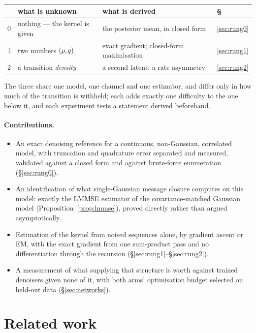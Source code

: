 \documentclass{article}
\begin{document}
\begin{center}\small
\begin{tabular}{@{}clll@{}}
\toprule
 & what is unknown & what is derived & \S \\
\midrule
0 & nothing --- the kernel is given & the posterior mean, in closed form & \ref{sec:rung0} \\
1 & two numbers $(\rho,q)$ & exact gradient; closed-form maximisation & \ref{sec:rung1} \\
2 & a transition \emph{density} & a second latent; a rate asymmetry & \ref{sec:rung2} \\
\bottomrule
\end{tabular}
\end{center}

\noindent
The three share one model, one channel and one estimator, and differ only in how much of the
transition is withheld; each adds exactly one difficulty to the one below it, and each experiment
tests a statement derived beforehand.

\paragraph{Contributions.}
\begin{itemize}\itemsep2pt
\item An exact denoising reference for a continuous, non-Gaussian, correlated model, with
      truncation and quadrature error separated and measured, validated against a closed form and
      against brute-force enumeration (\S\ref{sec:rung0}).
\item An identification of what single-Gaussian message closure computes on this model: exactly
      the LMMSE estimator of the covariance-matched Gaussian model
      (Proposition~\ref{prop:lmmse}), proved directly rather than argued asymptotically.
\item Estimation of the kernel from noised sequences alone, by gradient ascent or EM, with the
      exact gradient from one sum-product pass and no differentiation through the recursion
      (\S\ref{sec:rung1}--\S\ref{sec:rung2}).
\item A measurement of what supplying that structure is worth against trained denoisers given none
      of it, with both arms' optimisation budget selected on held-out data (\S\ref{sec:networks}).
\end{itemize}

\section{Related work}
\label{sec:related}
\end{document}
